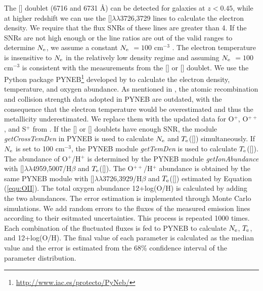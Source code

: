 \documentclass[twocolumn]{aastex631}
\newcommand{\Hb}{\mbox{H$\beta$}}       %
\newcommand{\SII}{[\mbox{\ion{S}{2}}]}    %
\newcommand{\OIII}{[\mbox{\ion{O}{3}}]}   %
\newcommand{\OII}{[\mbox{\ion{O}{2}}]}    %
\newcommand{\Te}{\mbox{$T_{\rm e}$}}
\newcommand{\Ne}{\mbox{$N_{\rm e}$}}
\newcommand{\boldtext}[1]{\textcolor[rgb]{0,0,0}{#1}}
\begin{document}
The {\SII} doublet (6716 and 6731 \AA) can be detected for galaxies at $z<0.45$, while at higher redshift we can use the \OII$\lambda\lambda$3726,3729 lines to calculate the electron density. We require that the flux SNRs of these lines are greater than 4. If the SNRs are not high enough or the line ratios are out of the valid ranges to determine \Ne, we assume a constant {\Ne} $= 100 $ cm$^{-3}$ \citep{And13,LyC14,Gao17}. The electron temperature is insensitive to {\Ne} in the relatively low density regime and assuming {\Ne} $ = 100$ cm$^{-3}$ is consistent with the measurements from the {\OII} or {\SII} doublet. We use the Python package PYNEB\footnote{\url{http://www.iac.es/protecto/PyNeb/}} developed by \citet{Lur15} to calculate the electron density, temperature, and oxygen abundance. As mentioned in \citet{Gao17}, the atomic recombination and collision strength data adopted in PYNEB are outdated, with the consequence that the electron temperature would be overestimated and thus the metallicity underestimated. We replace them with the updated data for O$^+$, O$^{++}$, and S$^+$ from \citet{Fro04,Kis09,Tay10,Sto14}. If the {\SII} or {\OII} doublets have enough SNR, the module \textit{getCrossTemDen} in PYNEB is used to calculate {\Ne} and \Te(\OIII) simultaneously. If {\Ne} is set to 100 cm$^{-3}$, the PYNEB module \textit{getTemDen} is used to calculate \Te(\OIII). \boldtext{The abundance of O$^+$/H$^+$ is determined by the PYNEB module \textit{getIonAbundance} with \OIII$\lambda\lambda$4959,5007/{\Hb} and \Te(\OIII). The O$^{++}$/H$^+$ abundance is obtained by the same PYNEB module with \OII$\lambda\lambda$3726,3929/{\Hb} and \Te(\OII) estimated by Equation (\ref{equ:OII}).} The total oxygen abundance 12+log(O/H) is calculated by adding the two abundances. The error estimation is implemented through Monte Carlo simulations. \boldtext{We add random errors to the fluxes of the measured emission lines according to their esitmated uncertainties. This process is repeated 1000 times.} Each combination of the fluctuated fluxes is fed to PYNEB to calculate \Ne, \Te, and 12+log(O/H).  The final value of each parameter is calculated as the median value and the error is estimated from the 68\% confidence interval of the parameter distribution. 
\end{document}
